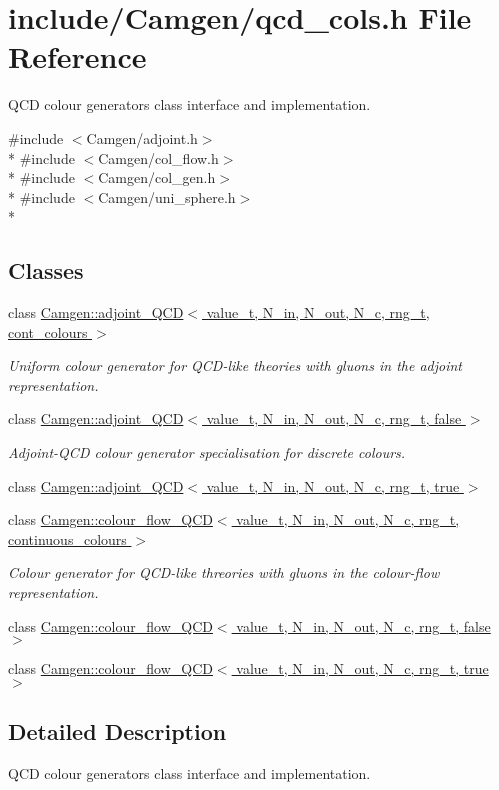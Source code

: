 \hypertarget{a00724}{\section{include/\-Camgen/qcd\-\_\-cols.h File Reference}
\label{a00724}
}


Q\-C\-D colour generators class interface and implementation.  


{\ttfamily \#include $<$Camgen/adjoint.\-h$>$}\\*
{\ttfamily \#include $<$Camgen/col\-\_\-flow.\-h$>$}\\*
{\ttfamily \#include $<$Camgen/col\-\_\-gen.\-h$>$}\\*
{\ttfamily \#include $<$Camgen/uni\-\_\-sphere.\-h$>$}\\*
\subsection*{Classes}
\begin{DoxyCompactItemize}
\item 
class \hyperlink{a00003}{Camgen\-::adjoint\-\_\-\-Q\-C\-D$<$ value\-\_\-t, N\-\_\-in, N\-\_\-out, N\-\_\-c, rng\-\_\-t, cont\-\_\-colours $>$}
\begin{DoxyCompactList}\small\item\em Uniform colour generator for Q\-C\-D-\/like theories with gluons in the adjoint representation. \end{DoxyCompactList}\item 
class \hyperlink{a00004}{Camgen\-::adjoint\-\_\-\-Q\-C\-D$<$ value\-\_\-t, N\-\_\-in, N\-\_\-out, N\-\_\-c, rng\-\_\-t, false $>$}
\begin{DoxyCompactList}\small\item\em Adjoint-\/\-Q\-C\-D colour generator specialisation for discrete colours. \end{DoxyCompactList}\item 
class \hyperlink{a00005}{Camgen\-::adjoint\-\_\-\-Q\-C\-D$<$ value\-\_\-t, N\-\_\-in, N\-\_\-out, N\-\_\-c, rng\-\_\-t, true $>$}
\item 
class \hyperlink{a00079}{Camgen\-::colour\-\_\-flow\-\_\-\-Q\-C\-D$<$ value\-\_\-t, N\-\_\-in, N\-\_\-out, N\-\_\-c, rng\-\_\-t, continuous\-\_\-colours $>$}
\begin{DoxyCompactList}\small\item\em Colour generator for Q\-C\-D-\/like threories with gluons in the colour-\/flow representation. \end{DoxyCompactList}\item 
class \hyperlink{a00080}{Camgen\-::colour\-\_\-flow\-\_\-\-Q\-C\-D$<$ value\-\_\-t, N\-\_\-in, N\-\_\-out, N\-\_\-c, rng\-\_\-t, false $>$}
\item 
class \hyperlink{a00081}{Camgen\-::colour\-\_\-flow\-\_\-\-Q\-C\-D$<$ value\-\_\-t, N\-\_\-in, N\-\_\-out, N\-\_\-c, rng\-\_\-t, true $>$}
\end{DoxyCompactItemize}


\subsection{Detailed Description}
Q\-C\-D colour generators class interface and implementation. 